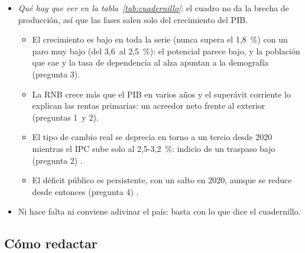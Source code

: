 \documentclass[11pt]{article}
\begin{document}
\begin{itemize}
\item \emph{Qué hay que ver en la tabla~\ref{tab:cuadernillo}}: el cuadro no da la brecha de producción, así que las fases salen solo del crecimiento del PIB.
  \begin{itemize}
  \item El crecimiento es bajo en toda la serie (nunca supera el 1,8~\%) con un paro muy bajo (del 3,6~al 2,5~\%): el potencial parece bajo, y la población que cae y la tasa de dependencia al alza apuntan a la demografía (pregunta 3).
  \item La RNB crece más que el PIB en varios años y el superávit corriente lo explican las rentas primarias: un acreedor neto frente al exterior (preguntas 1~y 2).
  \item El tipo de cambio real se deprecia en torno a un tercio desde 2020 mientras el IPC sube solo al 2,5-3,2~\%: indicio de un traspaso bajo (pregunta 2) \parencite{ATCEE2026Examenes}.
  \item El déficit público es persistente, con un salto en 2020, aunque se reduce desde entonces (pregunta 4) \parencite{ATCEE2026Examenes}.
  \end{itemize}
\item Ni hace falta ni conviene adivinar el país: basta con lo que dice el cuadernillo.
\end{itemize}

\subsection{Cómo redactar}\label{anexo:redactar}
\end{document}
